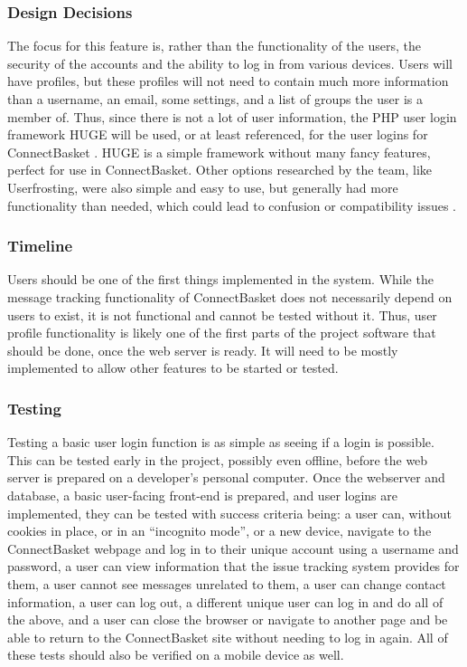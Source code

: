 \documentclass[onecolumn, draftclsnofoot,10pt, compsoc]{IEEEtran}
\begin{document}
\subsubsection{Design Decisions}
The focus for this feature is, rather than the functionality of the users, the security of the accounts and the ability to log in from various devices. Users will have profiles, but these profiles will not need to contain much more information than a username, an email, some settings, and a list of groups the user is a member of. Thus, since there is not a lot of user information, the PHP user login framework HUGE will be used, or at least referenced, for the user logins for ConnectBasket \cite{huge}. HUGE is a simple framework without many fancy features, perfect for use in ConnectBasket. Other options researched by the team, like Userfrosting, were also simple and easy to use, but generally had more functionality than needed, which could lead to confusion or compatibility issues \cite{userfrosting}.

\subsubsection{Timeline}
Users should be one of the first things implemented in the system. While the message tracking functionality of ConnectBasket does not necessarily depend on users to exist, it is not functional and cannot be tested without it. Thus, user profile functionality is likely one of the first parts of the project software that should be done, once the web server is ready. It will need to be mostly implemented to allow other features to be started or tested.

\subsubsection{Testing}
Testing a basic user login function is as simple as seeing if a login is possible. This can be tested early in the project, possibly even offline, before the web server is prepared on a developer’s personal computer. Once the webserver and database, a basic user-facing front-end is prepared, and user logins are implemented, they can be tested with success criteria being: a user can, without cookies in place, or in an “incognito mode”, or a new device, navigate to the ConnectBasket webpage and log in to their unique account using a username and password, a user can view information that the issue tracking system provides for them, a user cannot see messages unrelated to them, a user can change contact information, a user can log out, a different unique user can log in and do all of the above, and a user can close the browser or navigate to another page and be able to return to the ConnectBasket site without needing to log in again. All of these tests should also be verified on a mobile device as well.
\end{document}
